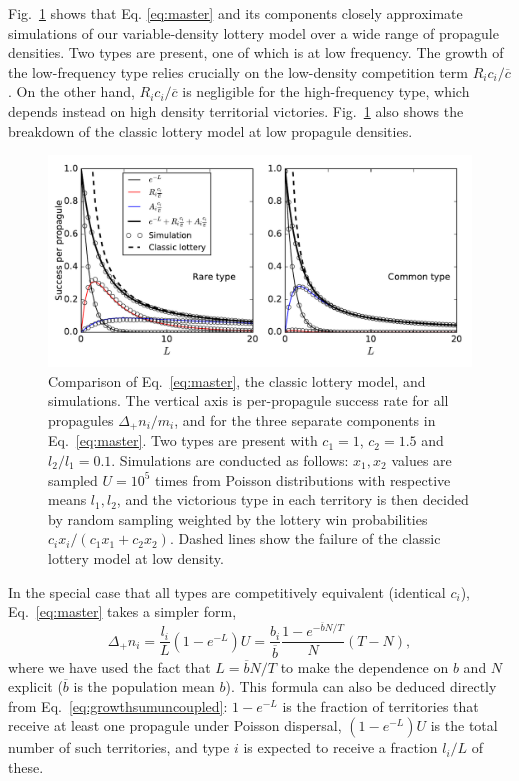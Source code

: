 \documentclass[12pt]{article}
\begin{document}
Fig.~\ref{fig:simcomp} shows that Eq. \eqref{eq:master} and its components closely approximate simulations of our variable-density lottery model over a wide range of propagule densities.  Two types are present, one of which is at low frequency. The growth of the low-frequency type relies crucially on the low-density competition term $R_i c_i/\overline{c}$. On the other hand, $R_i c_i/\overline{c}$ is negligible for the high-frequency type, which depends instead on high density territorial victories. Fig.~\ref{fig:simcomp} also shows the breakdown of the classic lottery model at low propagule densities.

\begin{figure}
\centering
\includegraphics[scale=0.8]{simulationcomparison.pdf}
\caption{\label{fig:simcomp} Comparison of Eq.~\eqref{eq:master}, the classic lottery model, and simulations. The vertical axis is per-propagule success rate for all propagules $\Delta_+ n_i/m_i$, and for the three separate components in Eq.~\eqref{eq:master}. Two types are present with $c_1=1$, $c_2=1.5$ and $l_2/l_1=0.1$. Simulations are conducted as follows: $x_1,x_2$ values are sampled $U=10^5$ times from Poisson distributions with respective means $l_1,l_2$, and the victorious type in each territory is then decided by random sampling weighted by the lottery win probabilities $c_ix_i/(c_1 x_1 + c_2 x_2)$. Dashed lines show the failure of the classic lottery model at low density.} 
\end{figure}

In the special case that all types are competitively equivalent (identical $c_i$), Eq.~\eqref{eq:master} takes a simpler form,
\begin{equation}
\Delta_+ n_i = \frac{l_i}{L}(1-e^{-L})U=\frac{b_i}{\overline{b}}\frac{1-e^{-\overline{b}N/T}}{N}(T-N), \label{eq:masterequalc}
\end{equation}
where we have used the fact that $L=\overline{b}N/T$ to make the dependence on $b$ and $N$ explicit ($\overline{b}$ is the population mean $b$). This formula can also be deduced directly from Eq.~\eqref{eq:growthsumuncoupled}: $1-e^{-L}$ is the fraction of territories that receive at least one propagule under Poisson dispersal, $(1-e^{-L})U$ is the total number of such territories, and type $i$ is expected to receive a fraction $l_i/L$ of these. 
\end{document}
